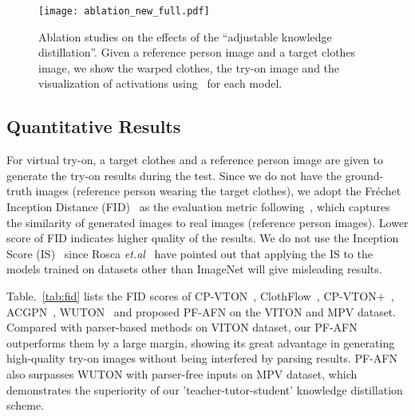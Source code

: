 \documentclass[final]{cvpr}
\begin{document}
	\begin{figure*}
		\begin{center}
			\texttt{[image: ablation\_new\_full.pdf]}
		\end{center}
		\vspace{-3mm}
		\caption{Ablation studies on the effects of the ``adjustable knowledge distillation''. Given a reference person image and a target clothes image, we show the warped clothes, the try-on image and the visualization of activations using~\cite{guided} for each model.}
		\label{fig:ablation}
	\end{figure*}
	
	\subsection{Quantitative Results}
For virtual try-on, a target clothes and a reference person image are given to generate the try-on results during the test.
Since we do not have the ground-truth images (\ie reference person wearing the target clothes), 
we adopt the Fr\'{e}chet Inception Distance (FID)~\cite{fid} as the evaluation metric following~\cite{parser_free}, which captures the similarity of generated images to real images (\ie reference person images).
Lower score of FID indicates higher quality of the results.
We do not use the Inception Score (IS)~\cite{IS} since Rosca \textit{et.al}~\cite{notIS} have pointed out that applying the IS to the models trained on datasets other than ImageNet will give misleading results.

Table.~\ref{tab:fid} lists the FID scores of CP-VTON~\cite{cpvton}, ClothFlow~\cite{clothflow}, CP-VTON+~\cite{cpvton_plus}, ACGPN~\cite{ACGPN}, WUTON~\cite{parser_free} and proposed PF-AFN on the VITON and MPV dataset.
Compared with parser-based methods on VITON dataset, our PF-AFN outperforms them by a large margin, showing its great advantage in generating high-quality try-on images without being interfered by parsing results.
PF-AFN also surpasses WUTON with parser-free inputs on MPV dataset, which demonstrates the superiority of our 'teacher-tutor-student' knowledge distillation scheme.

	
	
	
\end{document}
